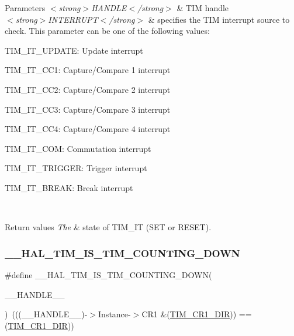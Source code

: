 \begin{DoxyParams}{Parameters}
{\em $<$strong$>$\+H\+A\+N\+D\+L\+E$<$/strong$>$} & T\+IM handle \\
\hline
{\em $<$strong$>$\+I\+N\+T\+E\+R\+R\+U\+P\+T$<$/strong$>$} & specifies the T\+IM interrupt source to check. This parameter can be one of the following values\+: \begin{DoxyItemize}
\item T\+I\+M\+\_\+\+I\+T\+\_\+\+U\+P\+D\+A\+TE\+: Update interrupt \item T\+I\+M\+\_\+\+I\+T\+\_\+\+C\+C1\+: Capture/\+Compare 1 interrupt \item T\+I\+M\+\_\+\+I\+T\+\_\+\+C\+C2\+: Capture/\+Compare 2 interrupt \item T\+I\+M\+\_\+\+I\+T\+\_\+\+C\+C3\+: Capture/\+Compare 3 interrupt \item T\+I\+M\+\_\+\+I\+T\+\_\+\+C\+C4\+: Capture/\+Compare 4 interrupt \item T\+I\+M\+\_\+\+I\+T\+\_\+\+C\+OM\+: Commutation interrupt \item T\+I\+M\+\_\+\+I\+T\+\_\+\+T\+R\+I\+G\+G\+ER\+: Trigger interrupt \item T\+I\+M\+\_\+\+I\+T\+\_\+\+B\+R\+E\+AK\+: Break interrupt \end{DoxyItemize}
\\
\hline
\end{DoxyParams}

\begin{DoxyRetVals}{Return values}
{\em The} & state of T\+I\+M\+\_\+\+IT (S\+ET or R\+E\+S\+ET). \\
\hline
\end{DoxyRetVals}
\mbox{\label{group___t_i_m___exported___macros_gac73f5e7669d92971830481e7298e98ba}} 
\subsubsection{\texorpdfstring{\_\_HAL\_TIM\_IS\_TIM\_COUNTING\_DOWN}{\_\_HAL\_TIM\_IS\_TIM\_COUNTING\_DOWN}}
{\footnotesize\ttfamily \#define \+\_\+\+\_\+\+H\+A\+L\+\_\+\+T\+I\+M\+\_\+\+I\+S\+\_\+\+T\+I\+M\+\_\+\+C\+O\+U\+N\+T\+I\+N\+G\+\_\+\+D\+O\+WN(\begin{DoxyParamCaption}\item[{}]{\+\_\+\+\_\+\+H\+A\+N\+D\+L\+E\+\_\+\+\_\+ }\end{DoxyParamCaption})~(((\+\_\+\+\_\+\+H\+A\+N\+D\+L\+E\+\_\+\+\_\+)-\/$>$Instance-\/$>$C\+R1 \&(\mbox{\hyperlink{group___peripheral___registers___bits___definition_gacea10770904af189f3aaeb97b45722aa}{T\+I\+M\+\_\+\+C\+R1\+\_\+\+D\+IR}})) == (\mbox{\hyperlink{group___peripheral___registers___bits___definition_gacea10770904af189f3aaeb97b45722aa}{T\+I\+M\+\_\+\+C\+R1\+\_\+\+D\+IR}}))}


